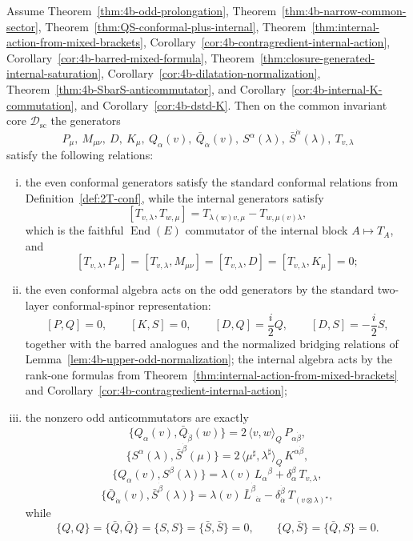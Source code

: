 \begin{theorem}
\label{thm:4d-SConf-brackets}
Assume Theorem~\ref{thm:4b-odd-prolongation},
Theorem~\ref{thm:4b-narrow-common-sector},
Theorem~\ref{thm:QS-conformal-plus-internal},
Theorem~\ref{thm:internal-action-from-mixed-brackets},
Corollary~\ref{cor:4b-contragredient-internal-action},
Corollary~\ref{cor:4b-barred-mixed-formula},
Theorem~\ref{thm:closure-generated-internal-saturation},
Corollary~\ref{cor:4b-dilatation-normalization},
Theorem~\ref{thm:4b-SbarS-anticommutator}, and
Corollary~\ref{cor:4b-internal-K-commutation},
and Corollary~\ref{cor:4b-dstd-K}. Then on the common
invariant core \(\mathcal D_{\mathrm{sc}}\) the generators
\[
  P_\mu,\ M_{\mu\nu},\ D,\ K_\mu,\ Q_\alpha(v),\ \bar Q_{\dot\alpha}(v),\
  S^\alpha(\lambda),\ \bar S^{\dot\alpha}(\lambda),\ T_{v,\lambda}
\]
satisfy the following relations:
\begin{enumerate}[(i)]
  \item the even conformal generators satisfy the standard conformal relations
        from Definition~\ref{def:2T-conf}, while the internal generators satisfy
\[
  [T_{v,\lambda},T_{w,\mu}]
  =
  T_{\lambda(w)v,\mu}-T_{w,\mu(v)\lambda},
\]
        which is the faithful \(\operatorname{End}(E)\) commutator of the
        internal block \(A\mapsto T_A\), and
\[
  [T_{v,\lambda},P_\mu]
  =
  [T_{v,\lambda},M_{\mu\nu}]
  =
  [T_{v,\lambda},D]
  =
  [T_{v,\lambda},K_\mu]
  =
  0;
\]
  \item the even conformal algebra acts on the odd generators by the standard
        two-layer conformal-spinor representation:
\[
  [P,Q]=0,
  \qquad
  [K,S]=0,
  \qquad
  [D,Q]=\frac{i}{2}Q,
  \qquad
  [D,S]=-\frac{i}{2}S,
\]
        together with the barred analogues and the normalized bridging relations
        of Lemma~\ref{lem:4b-upper-odd-normalization}; the internal algebra acts by
        the rank-one formulas from
        Theorem~\ref{thm:internal-action-from-mixed-brackets} and
        Corollary~\ref{cor:4b-contragredient-internal-action};
  \item the nonzero odd anticommutators are exactly
\[
  \{Q_\alpha(v),\bar Q_{\dot\beta}(w)\}
  =
  2\,\langle v,w\rangle_Q\,P_{\alpha\dot\beta},
\]
\[
  \{S^\alpha(\lambda),\bar S^{\dot\beta}(\mu)\}
  =
  2\,\langle \mu^\sharp,\lambda^\sharp\rangle_Q\,K^{\alpha\dot\beta},
\]
\[
  \{Q_\alpha(v),S^\beta(\lambda)\}
  =
  \lambda(v)\,L_\alpha{}^\beta+\delta_\alpha^\beta\,T_{v,\lambda},
\]
\[
  \{\bar Q_{\dot\alpha}(v),\bar S^{\dot\beta}(\lambda)\}
  =
  \lambda(v)\,\bar L^{\dot\beta}{}_{\dot\alpha}
  -\delta_{\dot\alpha}^{\dot\beta}\,T_{(v\otimes\lambda)^\star},
\]
        while
\[
  \{Q,Q\}=\{\bar Q,\bar Q\}=\{S,S\}=\{\bar S,\bar S\}=0,
  \qquad
  \{Q,\bar S\}=\{\bar Q,S\}=0.
\]
\end{enumerate}
\end{theorem}

